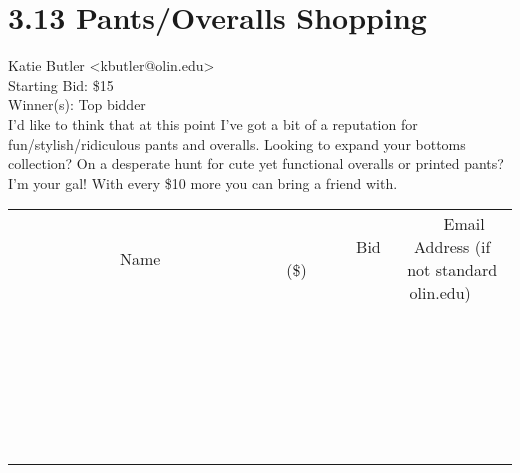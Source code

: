 \documentclass[11pt]{article}
\begin{document}
					\section*{3.13 Pants/Overalls Shopping}
					Katie Butler <kbutler@olin.edu> \\
					Starting Bid: \$15 \\
					Winner(s): Top bidder \\
					I'd like to think that at this point I've got a bit of a reputation for fun/stylish/ridiculous pants and overalls. Looking to expand your bottoms collection? On a desperate hunt for cute yet functional overalls or printed pants? I'm your gal! With every \$10 more you can bring a friend with. \\
					[6ex]
					\begin{tabular}{c c c}
						~~~~~~~~~~~~~Name~~~~~~~~~~~~~ & ~~~~~~~~~Bid (\$)~~~~~~~~~ & ~~~Email Address (if not standard olin.edu)~~~ \\
				
 & & \\
\hline
 & & \\
\hline
 & & \\
\hline
 & & \\
\hline
 & & \\
\hline
 & & \\
\hline
 & & \\
\hline
 & & \\
\hline
 & & \\
\hline
 & & \\
\hline
 & & \\
\hline
 & & \\
\hline
 & & \\
\hline
 & & \\
\hline
 & & \\
\hline
 & & \\
\hline
 & & \\
\hline
 & & \\
\hline
 & & \\
\hline
 & & \\
\hline
 & & \\
\hline
 & & \\
\hline
 & & \\
\hline
 & & \\
\hline
 & & \\
\hline
 & & \\
\hline
					\end{tabular}
					\clearpage
				
\end{document}
